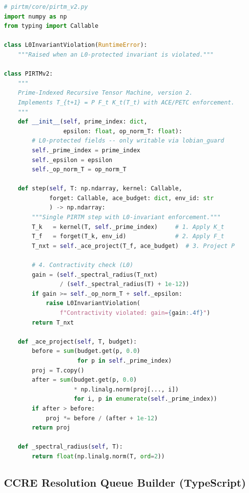 \documentclass[12pt,a4paper]{article}
\theoremstyle{definition}
\theoremstyle{plain}
\theoremstyle{remark}
\begin{document}
\begin{lstlisting}[language=Python, style=pythonstyle,
  caption={PIRTM v2 core update step --- Eq.~(\ref{eq:pirtm-update})},
  label={lst:pirtm}]
# pirtm/core/pirtm_v2.py
import numpy as np
from typing import Callable

class L0InvariantViolation(RuntimeError):
    """Raised when an L0-protected invariant is violated."""

class PIRTMv2:
    """
    Prime-Indexed Recursive Tensor Machine, version 2.
    Implements T_{t+1} = P F_t K_t(T_t) with ACE/PETC enforcement.
    """
    def __init__(self, prime_index: dict,
                 epsilon: float, op_norm_T: float):
        # L0-protected fields -- only writable via lobian_guard
        self._prime_index = prime_index
        self._epsilon = epsilon
        self._op_norm_T = op_norm_T

    def step(self, T: np.ndarray, kernel: Callable,
             forget: Callable, ace_budget: dict, env_id: str
             ) -> np.ndarray:
        """Single PIRTM step with L0-invariant enforcement."""
        T_k   = kernel(T, self._prime_index)     # 1. Apply K_t
        T_f   = forget(T_k, env_id)              # 2. Apply F_t
        T_nxt = self._ace_project(T_f, ace_budget)  # 3. Project P

        # 4. Contractivity check (L0)
        gain = (self._spectral_radius(T_nxt)
                / (self._spectral_radius(T) + 1e-12))
        if gain >= self._op_norm_T + self._epsilon:
            raise L0InvariantViolation(
                f"Contractivity violated: gain={gain:.4f}")
        return T_nxt

    def _ace_project(self, T, budget):
        before = sum(budget.get(p, 0.0)
                     for p in self._prime_index)
        proj = T.copy()
        after = sum(budget.get(p, 0.0)
                    * np.linalg.norm(proj[..., i])
                    for i, p in enumerate(self._prime_index))
        if after > before:
            proj *= before / (after + 1e-12)
        return proj

    def _spectral_radius(self, T):
        return float(np.linalg.norm(T, ord=2))
\end{lstlisting}

\subsection{CCRE Resolution Queue Builder (TypeScript)}
\end{document}
